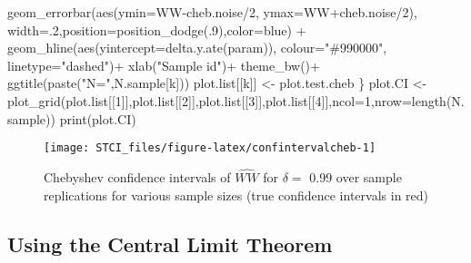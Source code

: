 \documentclass[
]{book}
\newenvironment{Shaded}{\begin{snugshade}}{\end{snugshade}}
\newcommand{\AttributeTok}[1]{\textcolor[rgb]{0.77,0.63,0.00}{#1}}
\newcommand{\DecValTok}[1]{\textcolor[rgb]{0.00,0.00,0.81}{#1}}
\newcommand{\FunctionTok}[1]{\textcolor[rgb]{0.00,0.00,0.00}{#1}}
\newcommand{\NormalTok}[1]{#1}
\newcommand{\OtherTok}[1]{\textcolor[rgb]{0.56,0.35,0.01}{#1}}
\newcommand{\SpecialCharTok}[1]{\textcolor[rgb]{0.00,0.00,0.00}{#1}}
\newcommand{\StringTok}[1]{\textcolor[rgb]{0.31,0.60,0.02}{#1}}
\theoremstyle{definition}
\theoremstyle{definition}
\theoremstyle{definition}
\theoremstyle{definition}
\theoremstyle{remark}
\begin{document}
\begin{Shaded}
\begin{Highlighting}[]
      \FunctionTok{geom\_errorbar}\NormalTok{(}\FunctionTok{aes}\NormalTok{(}\AttributeTok{ymin=}\NormalTok{WW}\SpecialCharTok{{-}}\NormalTok{cheb.noise}\SpecialCharTok{/}\DecValTok{2}\NormalTok{, }\AttributeTok{ymax=}\NormalTok{WW}\SpecialCharTok{+}\NormalTok{cheb.noise}\SpecialCharTok{/}\DecValTok{2}\NormalTok{), }\AttributeTok{width=}\NormalTok{.}\DecValTok{2}\NormalTok{,}\AttributeTok{position=}\FunctionTok{position\_dodge}\NormalTok{(.}\DecValTok{9}\NormalTok{),}\AttributeTok{color=}\StringTok{\textquotesingle{}blue\textquotesingle{}}\NormalTok{) }\SpecialCharTok{+}
      \FunctionTok{geom\_hline}\NormalTok{(}\FunctionTok{aes}\NormalTok{(}\AttributeTok{yintercept=}\FunctionTok{delta.y.ate}\NormalTok{(param)), }\AttributeTok{colour=}\StringTok{"\#990000"}\NormalTok{, }\AttributeTok{linetype=}\StringTok{"dashed"}\NormalTok{)}\SpecialCharTok{+}
      \FunctionTok{xlab}\NormalTok{(}\StringTok{"Sample id"}\NormalTok{)}\SpecialCharTok{+}
      \FunctionTok{theme\_bw}\NormalTok{()}\SpecialCharTok{+}
      \FunctionTok{ggtitle}\NormalTok{(}\FunctionTok{paste}\NormalTok{(}\StringTok{"N="}\NormalTok{,N.sample[k]))}
\NormalTok{  plot.list[[k]] }\OtherTok{\textless{}{-}}\NormalTok{ plot.test.cheb }
\NormalTok{\}}
\NormalTok{plot.CI }\OtherTok{\textless{}{-}} \FunctionTok{plot\_grid}\NormalTok{(plot.list[[}\DecValTok{1}\NormalTok{]],plot.list[[}\DecValTok{2}\NormalTok{]],plot.list[[}\DecValTok{3}\NormalTok{]],plot.list[[}\DecValTok{4}\NormalTok{]],}\AttributeTok{ncol=}\DecValTok{1}\NormalTok{,}\AttributeTok{nrow=}\FunctionTok{length}\NormalTok{(N.sample))}
\FunctionTok{print}\NormalTok{(plot.CI)}
\end{Highlighting}
\end{Shaded}

\begin{figure}[htbp]

{\centering \texttt{[image: STCI\_files/figure-latex/confintervalcheb-1]} 

}

\caption{Chebyshev confidence intervals of $\hat{WW}$ for $\delta=$ 0.99 over sample replications for various sample sizes (true confidence intervals in red)}\label{fig:confintervalcheb}
\end{figure}

\hypertarget{sec:CLT}{%
\subsection{Using the Central Limit Theorem}\label{sec:CLT}}
\end{document}
